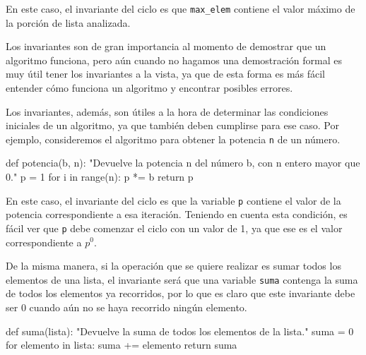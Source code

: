 En este caso, el invariante del ciclo es que \lstinline!max_elem! contiene el
valor máximo de la porción de lista analizada.

Los invariantes son de gran importancia al momento de demostrar que un
algoritmo funciona, pero aún cuando no hagamos una demostración formal es muy
útil tener los invariantes a la vista, ya que de esta forma es más fácil
entender cómo funciona un algoritmo y encontrar posibles errores.

Los invariantes, además, son útiles a la hora de determinar las condiciones
iniciales de un algoritmo, ya que también deben cumplirse para ese caso.  Por
ejemplo, consideremos el algoritmo para obtener la potencia \lstinline!n! de
un número.

\begin{codigo-python-sn}
def potencia(b, n):
    "Devuelve la potencia n del número b, con n entero mayor que 0."
    p = 1
    for i in range(n):
        p *= b
    return p
\end{codigo-python-sn}

En este caso, el invariante del ciclo es que la variable \lstinline!p!
contiene el valor de la potencia correspondiente a esa iteración. Teniendo en
cuenta esta condición, es fácil ver que \lstinline!p! debe comenzar el ciclo
con un valor de 1, ya que ese es el valor correspondiente a $p^0$.

De la misma manera, si la operación que se quiere realizar es sumar todos los
elementos de una lista, el invariante será que una variable \lstinline!suma!
contenga la suma de todos los elementos ya recorridos, por lo que es claro que
este invariante debe ser 0 cuando aún no se haya recorrido ningún elemento.

\begin{codigo-python-sn}
def suma(lista):
    "Devuelve la suma de todos los elementos de la lista."
    suma = 0
    for elemento in lista:
        suma += elemento
    return suma
\end{codigo-python-sn}




